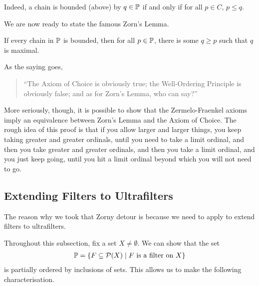 Indeed, a chain is bounded (above) by $q \in \P$ if and only if for all $p \in C$, $p \leq q$.

We are now ready to state the famous Zorn's Lemma.

\begin{boxtheorem}\label{SP:Zorn}
    If every chain in $\P$ is bounded, then for all $p \in \P$, there is some $q \geq p$ such that $q$ is maximal.
\end{boxtheorem}

As the saying goes,
\begin{quote}
    ``The Axiom of Choice is obviously true; the Well-Ordering Principle is obviously false; and as for Zorn's Lemma, who can say?''
\end{quote}
More seriously, though, it is possible to show that the Zermelo-Fraenkel axioms imply an equivalence between Zorn's Lemma and the Axiom of Choice. The rough idea of this proof is that if you allow larger and larger things, you keep taking greater and greater ordinals, until you need to take a limit ordinal, and then you take greater and greater ordinals, and then you take a limit ordinal, and you just keep going, until you hit a limit ordinal beyond which you will not need to go.

\subsection{Extending Filters to Ultrafilters}

The reason why we took that Zorny detour is because we need to apply  to extend filters to ultrafilters.

Throughout this subsection, fix a set $X \neq \emptyset$. We can show that the set
\begin{align*}
    \P = \setst{F \ssq \Powset{X}}{F \text{ is a filter on } X}
\end{align*}
is partially ordered by inclusions of sets. This allows us to make the following characterisation.

